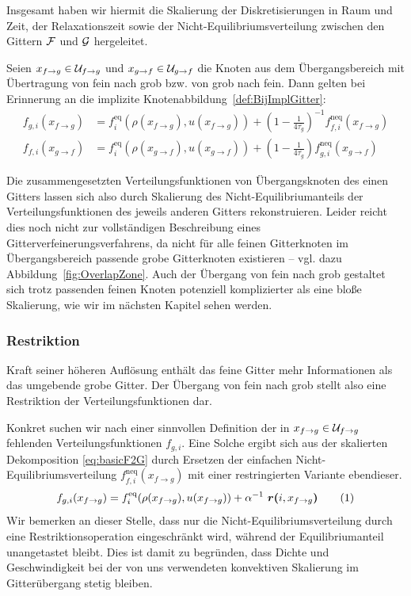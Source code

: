 Insgesamt haben wir hiermit die Skalierung der Diskretisierungen in Raum und Zeit, der Relaxationszeit sowie der Nicht-Equilibriumsverteilung zwischen den Gittern \(\mathcal{F}\) und \(\mathcal{G}\) hergeleitet.

\bigskip

Seien \(x_{f \to g} \in \mathcal{U}_{f \to g}\) und \(x_{g \to f} \in \mathcal{U}_{g \to f}\) die Knoten aus dem Übergangsbereich mit Übertragung von fein nach grob bzw. von grob nach fein. Dann gelten bei Erinnerung an die implizite Knotenabbildung~\ref{def:BijImplGitter}:
\begin{align}
f_{g,i}(x_{f \to g}) &= f_i^\text{eq}(\rho(x_{f \to g}), u(x_{f \to g})) + \left(1-\frac{1}{4\overline{\tau_g}}\right)^{-1} f_{f,i}^\text{neq}(x_{f \to g}) \label{eq:basicF2G} \\
f_{f,i}(x_{g \to f}) &= f_i^\text{eq}(\rho(x_{g \to f}), u(x_{g \to f})) + \left(1-\frac{1}{4\overline{\tau_g}}\right) f_{g,i}^\text{neq}(x_{g \to f}) \label{eq:basicG2F}
\end{align}

Die zusammengesetzten Verteilungsfunktionen von Übergangsknoten des einen Gitters lassen sich also durch Skalierung des Nicht-Equilibriumanteils der Verteilungsfunktionen des jeweils anderen Gitters rekonstruieren. Leider reicht dies noch nicht zur vollständigen Beschreibung eines Gitterverfeinerungsverfahrens, da nicht für alle feinen Gitterknoten im Übergangsbereich passende grobe Gitterknoten existieren -- vgl. dazu Abbildung~\ref{fig:OverlapZone}. Auch der Übergang von fein nach grob gestaltet sich trotz passenden feinen Knoten potenziell komplizierter als eine bloße Skalierung, wie wir im nächsten Kapitel sehen werden.

\newpage
\subsubsection{Restriktion}

Kraft seiner höheren Auflösung enthält das feine Gitter mehr Informationen als das umgebende grobe Gitter. Der Übergang von fein nach grob stellt also eine Restriktion der Verteilungsfunktionen dar.

Konkret suchen wir nach einer sinnvollen Definition der in \(x_{f \to g} \in \mathcal{U}_{f \to g}\) fehlenden Verteilungsfunktionen \(f_{g,i}\). Eine Solche ergibt sich aus der skalierten Dekomposition \ref{eq:basicF2G} durch Ersetzen der einfachen Nicht-Equilibriumsverteilung \(f_{f,i}^\text{neq}(x_{f \to g})\) mit einer restringierten Variante ebendieser.
\[f_{g,i}(x_{f \to g}) = f_i^\text{eq}(\rho(x_{f \to g}), u(x_{f \to g})) + \alpha^{-1} \ \resarg{i}{x_{f \to g}} \numberthis\label{eq:restrictedF2G}\]
Wir bemerken an dieser Stelle, dass nur die Nicht-Equilibriumsverteilung durch eine Restriktionsoperation eingeschränkt wird, während der Equilibriumanteil unangetastet bleibt. Dies ist damit zu begründen, dass Dichte und Geschwindigkeit bei der von uns verwendeten konvektiven Skalierung im Gitterübergang stetig bleiben.

